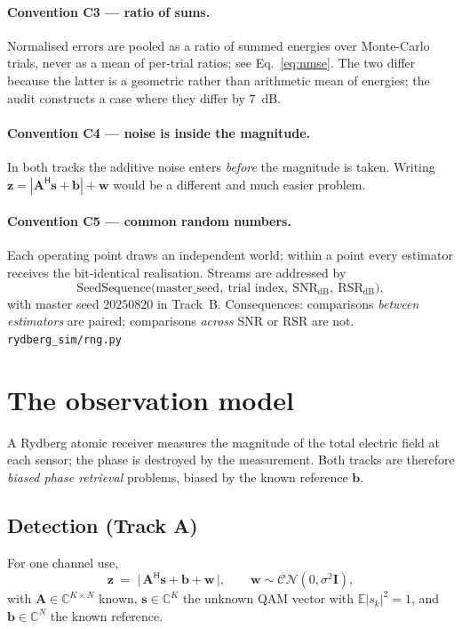 \documentclass[11pt,a4paper]{article}
\newcommand{\src}[1]{{\footnotesize\color{srcgray}\texttt{#1}}}
\newcommand{\C}{\mathbb{C}}
\newcommand{\E}{\mathbb{E}}
\newcommand{\CN}{\mathcal{CN}}
\newcommand{\herm}{\mathsf{H}}
\newcommand{\mat}[1]{\mathbf{#1}}
\newcommand{\vect}[1]{\mathbf{#1}}
\newcommand{\SNR}{\mathrm{SNR}}
\newcommand{\RSR}{\mathrm{RSR}}
\newcommand{\dB}{\mathrm{dB}}
\begin{document}
\paragraph{Convention C3 --- ratio of sums.}
Normalised errors are pooled as a ratio of summed energies over Monte-Carlo
trials, never as a mean of per-trial ratios; see Eq.~\eqref{eq:nmse}. The two
differ because the latter is a geometric rather than arithmetic mean of
energies; the audit constructs a case where they differ by $7$~dB.

\paragraph{Convention C4 --- noise is inside the magnitude.}
In both tracks the additive noise enters \emph{before} the magnitude is taken.
Writing $\vect{z}=|\mat{A}^{\herm}\vect{s}+\vect{b}|+\vect{w}$ would be a
different and much easier problem.

\paragraph{Convention C5 --- common random numbers.}
Each operating point draws an independent world; within a point every
estimator receives the bit-identical realisation. Streams are addressed by
\[
\text{SeedSequence}\bigl(\text{master\_seed},\ \text{trial index},\
\SNR_{\dB},\ \RSR_{\dB}\bigr),
\]
with master seed $20250820$ in Track~B. Consequences: comparisons
\emph{between estimators} are paired; comparisons \emph{across} SNR or RSR are
not. \src{rydberg\_sim/rng.py}

\section{The observation model}\label{sec:obs}

A Rydberg atomic receiver measures the magnitude of the total electric field
at each sensor; the phase is destroyed by the measurement. Both tracks are
therefore \emph{biased phase retrieval} problems, biased by the known
reference $\vect{b}$.

\subsection{Detection (Track A)}
For one channel use,
\begin{equation}
\vect{z} \;=\; \bigl|\,\mat{A}^{\herm}\vect{s} + \vect{b} + \vect{w}\,\bigr|,
\qquad \vect{w}\sim\CN(0,\sigma^2\mat{I}),
\label{eq:obsA}
\end{equation}
with $\mat{A}\in\C^{K\times N}$ known, $\vect{s}\in\C^{K}$ the unknown QAM
vector with $\E|s_k|^2=1$, and $\vect{b}\in\C^{N}$ the known reference.
\end{document}
